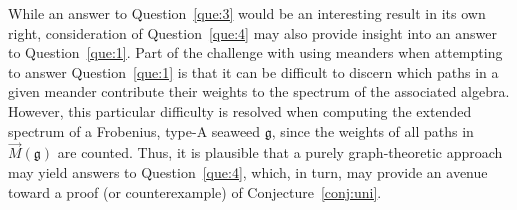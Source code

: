 \documentclass[letterpaper,10pt]{article}
\begin{document}
\noindent While an answer to Question~\ref{que:3} would be an interesting result in its own right, consideration of Question~\ref{que:4} may also provide insight into an answer to Question~\ref{que:1}. Part of the challenge with using meanders when attempting to answer Question~\ref{que:1} is that it can be difficult to discern which paths in a given meander contribute their weights to the spectrum of the associated algebra. However, this particular difficulty is resolved when computing the extended spectrum of a Frobenius, type-A seaweed $\mathfrak{g}$, since the weights of all paths in $\overrightarrow{M}(\mathfrak{g})$ are counted. Thus, it is plausible that a purely graph-theoretic approach may yield answers to Question~\ref{que:4}, which, in turn, may provide an avenue toward a proof (or counterexample) of Conjecture~\ref{conj:uni}.
\end{document}
